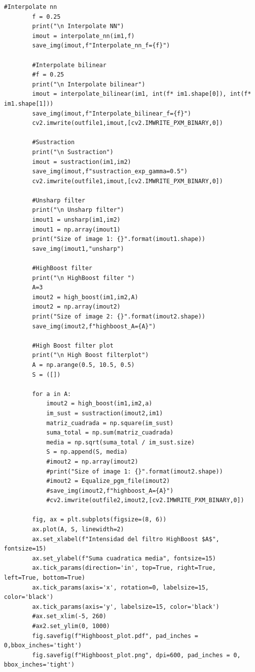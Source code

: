 \documentclass[letterpaper,12pt]{article}
\theoremstyle{plain}
\begin{document}
\begin{onecolumn}
\begin{lstlisting}[style=mystyle]
        #Interpolate nn
        f = 0.25
        print("\n Interpolate NN")
        imout = interpolate_nn(im1,f)
        save_img(imout,f"Interpolate_nn_f={f}")
    
        #Interpolate bilinear
        #f = 0.25
        print("\n Interpolate bilinear")
        imout = interpolate_bilinear(im1, int(f* im1.shape[0]), int(f* im1.shape[1]))
        save_img(imout,f"Interpolate_bilinear_f={f}")
        cv2.imwrite(outfile1,imout,[cv2.IMWRITE_PXM_BINARY,0])
    
        #Sustraction
        print("\n Sustraction")
        imout = sustraction(im1,im2)
        save_img(imout,f"sustraction_exp_gamma=0.5")
        cv2.imwrite(outfile1,imout,[cv2.IMWRITE_PXM_BINARY,0])
    
        #Unsharp filter
        print("\n Unsharp filter")
        imout1 = unsharp(im1,im2)
        imout1 = np.array(imout1)
        print("Size of image 1: {}".format(imout1.shape))
        save_img(imout1,"unsharp")
    
        #HighBoost filter
        print("\n HighBoost filter ")
        A=3
        imout2 = high_boost(im1,im2,A)
        imout2 = np.array(imout2)
        print("Size of image 2: {}".format(imout2.shape))
        save_img(imout2,f"highboost_A={A}")
    
        #High Boost filter plot
        print("\n High Boost filterplot")
        A = np.arange(0.5, 10.5, 0.5)
        S = ([])
    
        for a in A:
            imout2 = high_boost(im1,im2,a)
            im_sust = sustraction(imout2,im1)
            matriz_cuadrada = np.square(im_sust)
            suma_total = np.sum(matriz_cuadrada)
            media = np.sqrt(suma_total / im_sust.size)
            S = np.append(S, media)
            #imout2 = np.array(imout2)
            #print("Size of image 1: {}".format(imout2.shape))
            #imout2 = Equalize_pgm_file(imout2)
            #save_img(imout2,f"highboost_A={A}")
            #cv2.imwrite(outfile2,imout2,[cv2.IMWRITE_PXM_BINARY,0])
        
        fig, ax = plt.subplots(figsize=(8, 6))
        ax.plot(A, S, linewidth=2)
        ax.set_xlabel(f"Intensidad del filtro HighBoost $A$", fontsize=15)
        ax.set_ylabel(f"Suma cuadratica media", fontsize=15)
        ax.tick_params(direction='in', top=True, right=True, left=True, bottom=True)
        ax.tick_params(axis='x', rotation=0, labelsize=15, color='black')
        ax.tick_params(axis='y', labelsize=15, color='black')
        #ax.set_xlim(-5, 260)
        #ax2.set_ylim(0, 1000)
        fig.savefig(f"Highboost_plot.pdf", pad_inches = 0,bbox_inches='tight')
        fig.savefig(f"Highboost_plot.png", dpi=600, pad_inches = 0, bbox_inches='tight')
\end{lstlisting}
\end{onecolumn}
\end{document}

